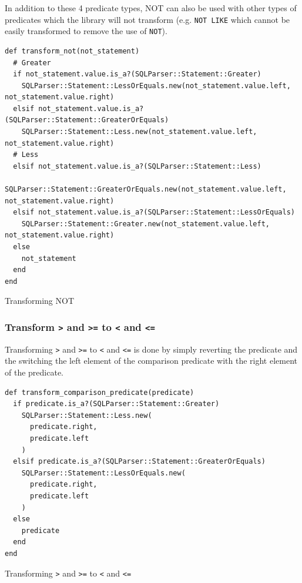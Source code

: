 In addition to these 4 predicate types, NOT can also be used with other types of predicates which the library will not transform (e.g. \texttt{NOT LIKE} which cannot be easily transformed to remove the use of \texttt{NOT}).

\begin{code}
\begin{verbatim}
def transform_not(not_statement)
  # Greater
  if not_statement.value.is_a?(SQLParser::Statement::Greater)
    SQLParser::Statement::LessOrEquals.new(not_statement.value.left, not_statement.value.right)
  elsif not_statement.value.is_a?(SQLParser::Statement::GreaterOrEquals)
    SQLParser::Statement::Less.new(not_statement.value.left, not_statement.value.right)
  # Less
  elsif not_statement.value.is_a?(SQLParser::Statement::Less)
    SQLParser::Statement::GreaterOrEquals.new(not_statement.value.left, not_statement.value.right)
  elsif not_statement.value.is_a?(SQLParser::Statement::LessOrEquals)
    SQLParser::Statement::Greater.new(not_statement.value.left, not_statement.value.right)
  else
    not_statement
  end
end
\end{verbatim}
\caption{Transforming NOT}
\label{fig:transforming_not}
\end{code}

\subsubsection{Transform \texttt{>} and \texttt{>=} to \texttt{<} and \texttt{<=}}

Transforming \texttt{>} and \texttt{>=} to \texttt{<} and \texttt{<=} is done by simply reverting the predicate and the switching the left element of the comparison predicate with the right element of the predicate.

\begin{code}
\begin{verbatim}
def transform_comparison_predicate(predicate)
  if predicate.is_a?(SQLParser::Statement::Greater)
    SQLParser::Statement::Less.new(
      predicate.right,
      predicate.left
    )
  elsif predicate.is_a?(SQLParser::Statement::GreaterOrEquals)
    SQLParser::Statement::LessOrEquals.new(
      predicate.right,
      predicate.left
    )
  else
    predicate
  end
end
\end{verbatim}
\caption{Transforming \texttt{>} and \texttt{>=} to \texttt{<} and \texttt{<=}}
\label{fig:transforming_great}
\end{code}

